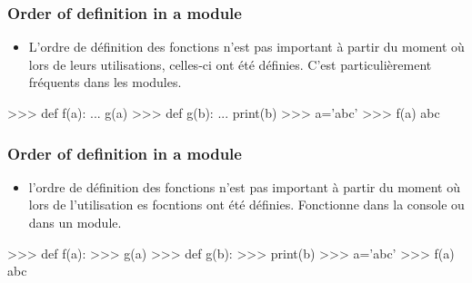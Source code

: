 \begin{frame}[fragile]
\frametitle{Order of definition in a module}
\begin{itemize}
 \item L'ordre de définition des fonctions n'est pas important à partir du moment où lors de leurs utilisations, celles-ci ont été définies. 
 C'est particulièrement fréquents dans les modules. 
\end{itemize}
\begin{pythonConsole}
>>> def f(a): 
...     g(a)
>>> def g(b): 
...     print(b)
>>> a='abc'
>>> f(a)
abc
\end{pythonConsole}
\end{frame}

\begin{frame}[fragile]
\frametitle{Order of definition in a module}
\begin{itemize}
 \item l'ordre de définition des fonctions n'est pas important à partir du moment où lors de l'utilisation es focntions ont été définies. 
 Fonctionne dans la console ou dans un module. 
\end{itemize}
\begin{pythonConsole}
>>> def f(a): 
>>>     g(a)
>>> def g(b): 
>>>     print(b)
>>> a='abc'
>>> f(a)
abc
\end{pythonConsole}
\end{frame}

